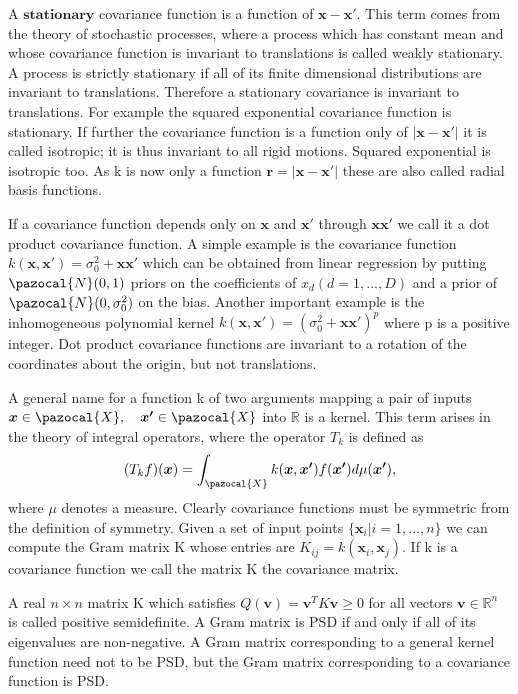 \documentclass[12pt,a4paper,oneside]{book}
\theoremstyle{plain}
\theoremstyle{definition}
\begin{document}
{\vspace{3mm}\noindent 
A $\bm{stationary}$ covariance function is a function of $\bm{x}-\bm{x'}$. This term comes from the theory of stochastic processes, where a process which has constant mean and whose covariance function is invariant to translations is called weakly stationary. A process is strictly stationary if all of its finite dimensional distributions are invariant to translations. Therefore a stationary covariance is invariant to translations. For example the squared exponential covariance function is stationary. If further the covariance function is a function only of $|\bm{x}-\bm{x'}|$ it is called isotropic; it is thus invariant to all rigid motions. Squared exponential is isotropic too. As k is now only a function $\bm{r}=|\bm{x}-\bm{x'}|$ these are also called radial basis functions.

\vspace{3mm}
\noindent 
If a covariance function depends only on $\bm{x}$ and $\bm{x'}$ through $\bm{x}\bm{x'}$ we call it a dot product covariance function. A simple example is the covariance function $k(\bm{x},\bm{x'})=\sigma_0^2 + \bm{x}\bm{x'}$ which can be obtained from linear regression by putting $\pazocal{N}(0,1)$ priors on the coefficients of $x_d(d=1,...,D)$ and a prior of $\pazocal{N}(0,\sigma_0^2)$ on the bias. Another important example is the inhomogeneous polynomial kernel $k(\bm{x},\bm{x'})=(\sigma_0^2+\bm{x}\bm{x'})^p$ where p is a positive integer. Dot product covariance functions are invariant to a rotation of the coordinates about the origin, but not translations. 

\vspace{3mm}\noindent
A general name for a function k of two arguments mapping a pair of inputs $\bm{x}\in \pazocal{X}, \quad \bm{x'}\in \pazocal{X}$ into $\mathbb{R}$ is a kernel.  This term arises in the theory of integral operators, where the operator $T_k$ is defined as $$(T_kf)(\bm{x})=\int_{\pazocal{X}}k(\bm{x},\bm{x'})f(\bm{x'})d\mu(\bm{x'}),$$ where $\mu$ denotes a measure. Clearly covariance functions must be symmetric from the definition of symmetry. Given a set of input points $\lbrace \bm{x}_i|i=1,...,n\rbrace$ we can compute the Gram matrix K whose entries are $K_{ij}=k(\bm{x}_i,\bm{x}_j).$ If k is a covariance function we call the matrix K the covariance matrix. 

\vspace{3mm}\noindent
A real $n\times n$ matrix K which satisfies $Q(\bm{v})=\bm{v}^TK\bm{v}\geq 0$ for all vectors $\bm{v}\in \mathbb{R}^n$ is called positive semidefinite. A Gram matrix is PSD if and only if all of its eigenvalues are non-negative. A Gram matrix corresponding to a general kernel function  need not to be PSD, but the Gram matrix corresponding to a covariance function is PSD. 

}
\end{document}
